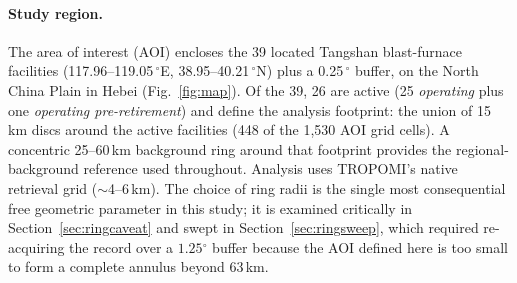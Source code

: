 \documentclass[11pt,a4paper]{article}
\providecommand{\degree}{\ensuremath{^{\circ}}}
\begin{document}
\paragraph{Study region.} The area of interest (AOI) encloses the 39 located Tangshan
blast-furnace facilities (117.96--119.05\,\degree E, 38.95--40.21\,\degree N) plus a
0.25\,\degree{} buffer, on the North China Plain in Hebei (Fig.~\ref{fig:map}). Of the 39, 26
are active (25 \emph{operating} plus one \emph{operating pre-retirement}) and define the
analysis footprint: the union of 15\,km discs around the active facilities (448 of the
1{,}530 AOI grid cells). A concentric
25--60\,km background ring around that footprint provides the regional-background reference used
throughout. Analysis uses TROPOMI's native retrieval grid ($\sim$4--6\,km). The choice of ring
radii is the single most consequential free geometric parameter in this study; it is examined
critically in Section~\ref{sec:ringcaveat} and swept in Section~\ref{sec:ringsweep}, which required
re-acquiring the record over a $1.25\degree$ buffer because the AOI defined here is too small to
form a complete annulus beyond 63\,km.
\end{document}
